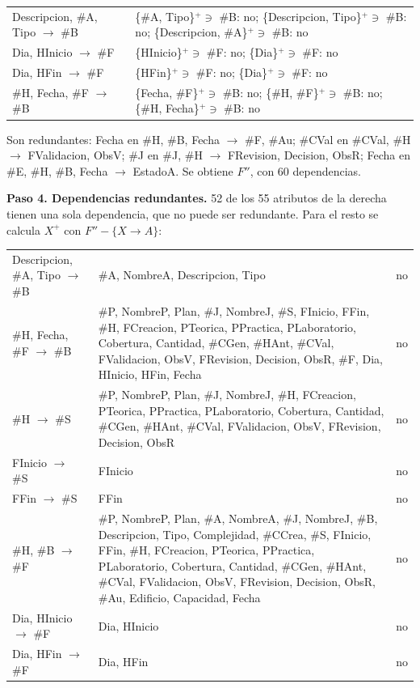 {\begin{xltabular}{\linewidth}{L{0.7}L{1.3}}
Descripcion, \#A, Tipo \ensuremath{\to} \#B & \{\#A, Tipo\}$^+ \ni$ \#B: no; \{Descripcion, Tipo\}$^+ \ni$ \#B: no; \{Descripcion, \#A\}$^+ \ni$ \#B: no \\
Dia, HInicio \ensuremath{\to} \#F & \{HInicio\}$^+ \ni$ \#F: no; \{Dia\}$^+ \ni$ \#F: no \\
Dia, HFin \ensuremath{\to} \#F & \{HFin\}$^+ \ni$ \#F: no; \{Dia\}$^+ \ni$ \#F: no \\
\#H, Fecha, \#F \ensuremath{\to} \#B & \{Fecha, \#F\}$^+ \ni$ \#B: no; \{\#H, \#F\}$^+ \ni$ \#B: no; \{\#H, Fecha\}$^+ \ni$ \#B: no \\
\end{xltabular}}

Son redundantes: Fecha en \#H, \#B, Fecha \ensuremath{\to} \#F, \#Au; \#CVal en \#CVal, \#H \ensuremath{\to} FValidacion, ObsV; \#J en \#J, \#H \ensuremath{\to} FRevision, Decision, ObsR; Fecha en \#E, \#H, \#B, Fecha \ensuremath{\to} EstadoA. Se obtiene $F''$, con 60 dependencias.


\textbf{Paso 4. Dependencias redundantes.} 52 de los 55 atributos de la derecha tienen una sola dependencia, que no puede ser redundante. Para el resto se calcula $X^+$ con $F'' - \{X \to A\}$:

{\footnotesize\filas
\begin{xltabular}{\linewidth}{L{0.55}L{1.3}>{\centering\arraybackslash}p{16mm}}
 &  &  \\
\endhead
Descripcion, \#A, Tipo \ensuremath{\to} \#B & \#A, NombreA, Descripcion, Tipo & no \\
\#H, Fecha, \#F \ensuremath{\to} \#B & \#P, NombreP, Plan, \#J, NombreJ, \#S, FInicio, FFin, \#H, FCreacion, PTeorica, PPractica, PLaboratorio, Cobertura, Cantidad, \#CGen, \#HAnt, \#CVal, FValidacion, ObsV, FRevision, Decision, ObsR, \#F, Dia, HInicio, HFin, Fecha & no \\
\#H \ensuremath{\to} \#S & \#P, NombreP, Plan, \#J, NombreJ, \#H, FCreacion, PTeorica, PPractica, PLaboratorio, Cobertura, Cantidad, \#CGen, \#HAnt, \#CVal, FValidacion, ObsV, FRevision, Decision, ObsR & no \\
FInicio \ensuremath{\to} \#S & FInicio & no \\
FFin \ensuremath{\to} \#S & FFin & no \\
\#H, \#B \ensuremath{\to} \#F & \#P, NombreP, Plan, \#A, NombreA, \#J, NombreJ, \#B, Descripcion, Tipo, Complejidad, \#CCrea, \#S, FInicio, FFin, \#H, FCreacion, PTeorica, PPractica, PLaboratorio, Cobertura, Cantidad, \#CGen, \#HAnt, \#CVal, FValidacion, ObsV, FRevision, Decision, ObsR, \#Au, Edificio, Capacidad, Fecha & no \\
Dia, HInicio \ensuremath{\to} \#F & Dia, HInicio & no \\
Dia, HFin \ensuremath{\to} \#F & Dia, HFin & no \\
\end{xltabular}}

